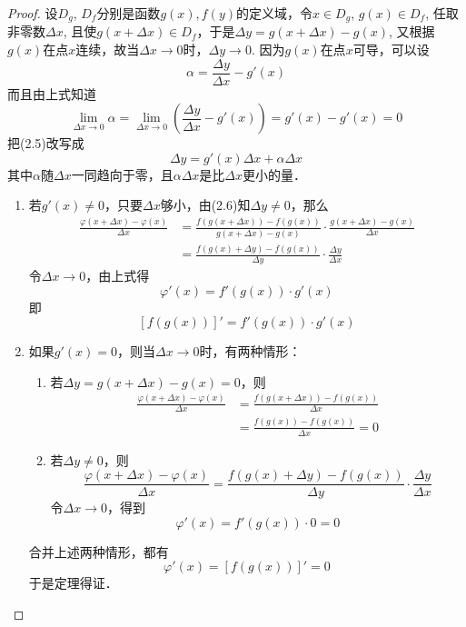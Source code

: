 \begin{proof}
    设$D_g$, $D_f$分别是函数$g(x),f(y)$的定义域，令$x\in D_g$, $g(x)\in D_f$, 任取非零数$\Delta x$, 且使$g(x+\Delta x)\in D_f$，于是$\Delta y=g(x+\Delta x)-g(x)$, 又根据$g(x)$在点$x$连续，故当$\Delta x\to 0$时，$\Delta y\to 0$. 因为$g(x)$在点$x$可导，可以设
\begin{equation}
    \alpha=\frac{\Delta y}{\Delta x}-g'(x)
\end{equation}
而且由上式知道
\[\lim_{\Delta x\to 0}\alpha=\lim_{\Delta x\to 0}\left(\frac{\Delta y}{\Delta x}-g'(x)\right)=g'(x)-g'(x)=0\]
把(2.5)改写成
\begin{equation}
    \Delta y=g'(x)\Delta x+\alpha\Delta x
\end{equation}
其中$\alpha$随$\Delta x$一同趋向于零，且$\alpha \Delta x$是比$\Delta x$更小的量．

\begin{enumerate}
    \item 若$g'(x)\ne 0$，只要$\Delta x$够小，由(2.6)知$\Delta y\ne 0$，那么
\begin{align*}
    \frac{\varphi(x+\Delta x)-\varphi(x)}{\Delta x}&=\frac{f(g(x+\Delta x))-f(g(x))}{g(x+\Delta x)-g(x)}\cdot \frac{g(x+\Delta x)-g(x)}{\Delta x}\\
    &=\frac{f(g(x)+\Delta y)-f(g(x))}{\Delta y}\cdot \frac{\Delta y}{\Delta x}
\end{align*}
令$\Delta x\to 0$，由上式得
\[\varphi'(x)=f'(g(x))\cdot g'(x)\]
即
\[[f(g(x))]'=f'(g(x))\cdot g'(x)\]

\item 如果$g'(x)=0$，则当$\Delta x\to 0$时，有两种情形：
\begin{enumerate}
    \item 若$\Delta y=g(x+\Delta x)-g(x)=0$，则
\begin{align*}
    \frac{\varphi(x+\Delta x)-\varphi(x)}{\Delta x}&=\frac{f(g(x+\Delta x))-f(g(x))}{\Delta x}\\
    &=\frac{f(g(x))-f(g(x))}{\Delta x}=0
\end{align*}
\item 若$\Delta y\ne 0$，则
\[\frac{\varphi(x+\Delta x)-\varphi(x)}{\Delta x}=\frac{f(g(x)+\Delta y)-f(g(x))}{\Delta y}\cdot \frac{\Delta y}{\Delta x}\]
令$\Delta x\to 0$，得到
\[\varphi'(x)=f'(g(x))\cdot 0=0\]
\end{enumerate}
合并上述两种情形，都有
\[\varphi'(x)=[f(g(x))]'=0\]
于是定理得证．
\end{enumerate}
\end{proof}

